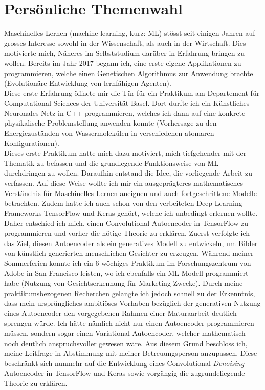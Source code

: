 \section*{Persönliche Themenwahl}
Maschinelles Lernen (machine learning, kurz: ML) stösst seit einigen Jahren auf grosses
Interesse sowohl in der Wissenschaft, als auch in der Wirtschaft. Dies
motivierte mich, Näheres im Selbststudium darüber in Erfahrung bringen zu wollen.
Bereits im Jahr 2017 begann ich, eine erste eigene Applikationen zu programmieren, welche
einen Genetischen Algorithmus zur Anwendung brachte (Evolutionäre Entwicklung
von lernfähigen Agenten). \\
Diese erste Erfahrung öffnete mir die Tür für ein Praktikum am Departement für
Computational Sciences der Universität Basel.
Dort durfte ich ein Künstliches Neuronales Netz
in C++ programmieren, welches ich dann auf eine konkrete physikalische
Problemstellung anwenden konnte (Vorhersage zu den Energiezuständen von
Wassermolekülen in verschiedenen atomaren Konfigurationen). \\
Dieses erste Praktikum hatte mich dazu motiviert, mich tiefgehender mit der Thematik zu befassen
und die grundlegende Funktionsweise von ML durchdringen zu wollen.
\para{}
Daraufhin entstand die Idee, die vorliegende Arbeit zu verfassen.
Auf diese Weise wollte ich mir ein ausgeprägteres mathematisches
Verständnis für Maschinelles Lernen aneignen und auch fortgeschrittene
Modelle betrachten. Zudem hatte ich auch schon von den verbeiteten
Deep-Learning-Frameworks TensorFlow und Keras gehört, welche ich unbedingt
erlernen wollte. Daher entschied ich mich, einen Convolutional-Autoencoder in
TensorFlow zu programmieren und vorher die nötige Theorie zu erklären.
Zuerst verfolgte ich das Ziel, diesen Autoencoder als ein generatives Modell zu entwickeln,
um Bilder von künstlich generierten menschlichen Gesichter zu erzeugen.
\para{}
Während meiner Sommerferien konnte ich ein 6-wöchiges Praktikum im
Forschungszentrum von Adobe in San Francisco leisten, wo ich ebenfalls ein
ML-Modell programmiert habe (Nutzung von Gesichtserkennung für Marketing-Zwecke).
Durch meine praktikumsbezogenen Recherchen gelangte ich jedoch schnell zu der
Erkenntnis, dass mein ursprüngliches ambitiöses Vorhaben bezüglich der generativen Nutzung eines
Autoencoder den vorgegebenen Rahmen einer Maturaarbeit deutlich sprengen würde.
Ich hätte nämlich nicht nur einen Autoencoder programmieren müssen, sondern
sogar einen Variational Autoencoder, welcher mathematisch noch deutlich
anspruchsvoller gewesen wäre.
\para{}
Aus diesem Grund beschloss ich, meine Leitfrage in Abstimmung mit meiner
Betreuungsperson anzupassen. Diese beschränkt sich nunmehr auf die Entwicklung
eines Convolutional \textit{Denoising} Autoencoder in TensorFlow und Keras sowie
vorgängig die zugrundeliegende Theorie zu erklären.

